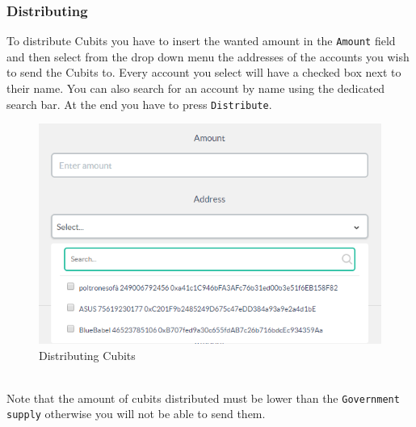 		\subsubsection{Distributing}
		To distribute Cubits\glosp{} you have to insert the wanted amount in
		the \texttt{Amount} field and then select from the drop down menu the
		addresses of the accounts you wish to send the Cubits to. Every account
		you select will have a checked box next to their name. You can also
		search for an account by name using the dedicated search bar. At the
		end you have to press \texttt{Distribute}.\\
		\begin{figure}[H]
			\includegraphics[width=15cm]{res/images/distributing.png}
			\centering
			\caption{Distributing Cubits}
		\end{figure} \mbox{}\\
		\noindent Note that the amount of cubits distributed must be lower than
		the \texttt{Government supply} otherwise you will not be able to send
		them.
